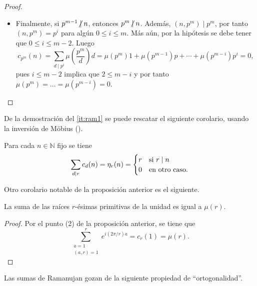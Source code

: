 \begin{proof}
\begin{enumerate}[label=\textnormal{(\arabic*)}]
\begin{itemize}
\item Finalmente, si $p^{m-1} \centernot\mid n$, entonces $p^m \centernot\mid n$. Además, $(n,p^m) \mid p^m$, por tanto $(n,p^m)=p^i$ para algún $0 \le i \le m$. Más aún, por la hipótesis se debe tener que $0 \le i \le m-2$. Luego
    \begin{equation*}
        c_{p^m}(n) = \sum_{d \mid p^i} \mu \left( \frac{p^m}{d} \right) d = \mu(p^m)1+ \mu(p^{m-1}) p + \cdots + \mu(p^{m-i}) p^i = 0,
    \end{equation*}
    pues $i \le m-2$ implica que $2 \le m-i$ y por tanto $\mu(p^m)=\ldots=\mu(p^{m-i})=0$.
\end{itemize}
\end{enumerate}
\end{proof}

De la demostración del \cref{it:ram1} se puede rescatar el siguiente corolario, usando la inversión de Möbius ().

\begin{corollary}\label{cor:ram5}
Para cada $n \in \mathbb{N}$ fijo se tiene
\begin{equation*}
    \sum_{d \mid r} c_d(n) = \eta_r(n) = \begin{cases}
        \hfil r & \text{si } r \mid n \\
        \hfil 0 & \text{en otro caso}.
    \end{cases}
\end{equation*}
\end{corollary}

Otro corolario notable de la proposición anterior es el siguiente.

\begin{corollary}
La suma de las raíces $r$-ésimas primitivas de la unidad es igual a $\mu(r)$.
\end{corollary}

\begin{proof}
Por el punto (2) de la proposición anterior, se tiene que
\begin{equation*}
    \sum_{\substack{a=1 \\ (a,r)=1}}^{r} e^{i(2 \pi / r) a} = c_r(1)  = \mu(r).
\end{equation*}
\end{proof}

Las sumas de Ramanujan gozan de la siguiente propiedad de ``ortogonalidad''.

